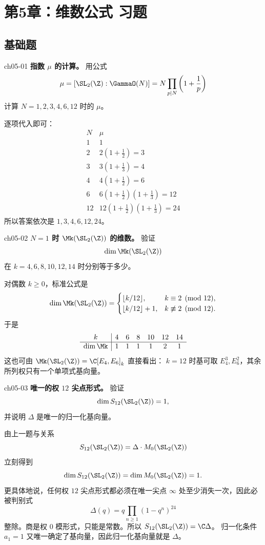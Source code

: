 \chapter{第5章：维数公式 习题}
\difficultykey

\section{基础题 \easy}

\begin{problem}{ch05-01}
\textbf{指数 $\mu$ 的计算。}
用公式
\[
\mu=[\SL_2(\Z):\GammaO(N)]=N\prod_{p\mid N}\left(1+\frac1p\right)
\]
计算 $N=1,2,3,4,6,12$ 时的 $\mu$。
\end{problem}
\begin{solution}
逐项代入即可：
\[
\begin{array}{c|c}
N & \mu \\ \hline
1 & 1 \\
2 & 2\left(1+\frac12\right)=3 \\
3 & 3\left(1+\frac13\right)=4 \\
4 & 4\left(1+\frac12\right)=6 \\
6 & 6\left(1+\frac12\right)\left(1+\frac13\right)=12 \\
12 & 12\left(1+\frac12\right)\left(1+\frac13\right)=24
\end{array}
\]
所以答案依次是 $1,3,4,6,12,24$。
\end{solution}

\begin{problem}{ch05-02}
\textbf{$N=1$ 时 $\Mk(\SL_2(\Z))$ 的维数。}
验证
\[
\dim \Mk(\SL_2(\Z))
\]
在 $k=4,6,8,10,12,14$ 时分别等于多少。
\end{problem}
\begin{solution}
对偶数 $k\ge 0$，标准公式是
\[
\dim \Mk(\SL_2(\Z))=
\begin{cases}
\lfloor k/12\rfloor,&k\equiv 2\pmod{12},\\
\lfloor k/12\rfloor+1,&k\not\equiv 2\pmod{12}.
\end{cases}
\]
于是
\[
\begin{array}{c|cccccc}
k & 4&6&8&10&12&14\\ \hline
\dim \Mk & 1&1&1&1&2&1
\end{array}
\]
这也可由 $\Mk(\SL_2(\Z))=\C[E_4,E_6]_k$ 直接看出：
$k=12$ 时基可取 $E_4^3,E_6^2$，其余所列权只有一个单项式基向量。
\end{solution}

\begin{problem}{ch05-03}
\textbf{唯一的权 $12$ 尖点形式。}
验证
\[
\dim S_{12}(\SL_2(\Z))=1,
\]
并说明 $\Delta$ 是唯一的归一化基向量。
\end{problem}
\begin{solution}
由上一题与关系
\[
S_{12}(\SL_2(\Z))=\Delta\cdot M_0(\SL_2(\Z))
\]
立刻得到
\[
\dim S_{12}(\SL_2(\Z))=\dim M_0(\SL_2(\Z))=1.
\]
更具体地说，任何权 $12$ 尖点形式都必须在唯一尖点 $\infty$ 处至少消失一次，因此必被判别式
\[
\Delta(q)=q\prod_{n\ge1}(1-q^n)^{24}
\]
整除。商是权 $0$ 模形式，只能是常数。所以 $S_{12}(\SL_2(\Z))=\C\Delta$。
归一化条件 $a_1=1$ 又唯一确定了基向量，因此归一化基向量就是 $\Delta$。
\end{solution}

